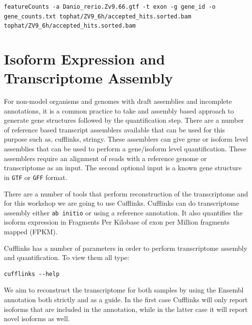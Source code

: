 \begin{steps}
\begin{lstlisting}[style=command_syntax]
featureCounts -a Danio_rerio.Zv9.66.gtf -t exon -g gene_id -o gene_counts.txt tophat/ZV9_6h/accepted_hits.sorted.bam tophat/ZV9_6h/accepted_hits.sorted.bam
\end{lstlisting}
\end{steps}


\newpage
\section{Isoform Expression and Transcriptome Assembly}

\begin{information}
For non-model organisms and genomes with draft assemblies and incomplete annotations, it is a common practice to take and assembly based approach to generate gene structures followed by the quantification step. There are a number of reference based transcript assemblers available that can be used for this purpose such as, cufflinks, stringy. These assemblers can give gene or isoform level assemblies that can be used to perform a gene/isoform level quantification. These assemblers require an alignment of reads with a reference genome or transcriptome as an input. The second optional input is a known gene structure in \texttt{GTF} or \texttt{GFF} format. 
\end{information}

There are a number of tools that perform reconstruction of the transcriptome
and for this workshop we are going to use Cufflinks. Cufflinks can do
transcriptome assembly either \texttt{ab initio} or using a reference annotation. It
also quantifies the isoform expression in Fragments
Per Kilobase of exon per Million fragments mapped (FPKM).

\begin{steps}
Cufflinks has a number of parameters in order to perform transcriptome
assembly and quantification. To view them all type:

\begin{lstlisting}
cufflinks --help
\end{lstlisting}
\end{steps}

We aim to reconstruct the transcriptome for both samples by using the Ensembl
annotation both strictly and as a guide. In the first case Cufflinks will only
report isoforms that are included in the annotation, while in the latter case
it will report novel isoforms as well.


